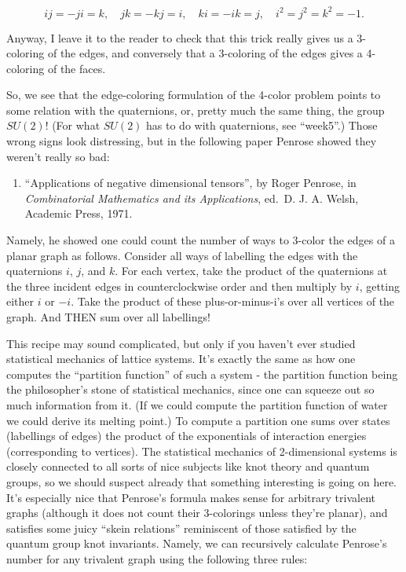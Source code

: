 \documentclass{article}
\def\tightlist{}
\begin{document}
\[ij = -ji = k, \quad jk = -kj = i, \quad  ki = -ik = j, \quad i^2 = j^2 = k^2 = -1.\]

Anyway, I leave it to the reader to check that this trick really gives
us a 3-coloring of the edges, and conversely that a 3-coloring of the
edges gives a 4-coloring of the faces.

So, we see that the edge-coloring formulation of the 4-color problem
points to some relation with the quaternions, or, pretty much the same
thing, the group \(SU(2)\)! (For what \(SU(2)\) has to do with
quaternions, see ``week5''.) Those wrong signs look distressing, but in
the following paper Penrose showed they weren't really so bad:

\begin{enumerate}
\def\labelenumi{\arabic{enumi})}
\setcounter{enumi}{3}
\tightlist
\item
  ``Applications of negative dimensional tensors'', by Roger Penrose, in
  \emph{Combinatorial Mathematics and its Applications}, ed.~D. J. A.
  Welsh, Academic Press, 1971.
\end{enumerate}

Namely, he showed one could count the number of ways to 3-color the
edges of a planar graph as follows. Consider all ways of labelling the
edges with the quaternions \(i\), \(j\), and \(k\). For each vertex,
take the product of the quaternions at the three incident edges in
counterclockwise order and then multiply by \(i\), getting either \(i\)
or \(-i\). Take the product of these plus-or-minus-i's over all vertices
of the graph. And THEN sum over all labellings!

This recipe may sound complicated, but only if you haven't ever studied
statistical mechanics of lattice systems. It's exactly the same as how
one computes the ``partition function'' of such a system - the partition
function being the philosopher's stone of statistical mechanics, since
one can squeeze out so much information from it. (If we could compute
the partition function of water we could derive its melting point.) To
compute a partition one sums over states (labellings of edges) the
product of the exponentials of interaction energies (corresponding to
vertices). The statistical mechanics of 2-dimensional systems is closely
connected to all sorts of nice subjects like knot theory and quantum
groups, so we should suspect already that something interesting is going
on here. It's especially nice that Penrose's formula makes sense for
arbitrary trivalent graphs (although it does not count their 3-colorings
unless they're planar), and satisfies some juicy ``skein relations''
reminiscent of those satisfied by the quantum group knot invariants.
Namely, we can recursively calculate Penrose's number for any trivalent
graph using the following three rules:
\end{document}
